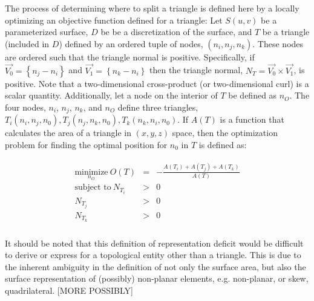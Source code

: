 The process of determining where to split a triangle is defined here by
a locally optimizing an objective function defined for a triangle: Let
$S(u,v)$ be a parameterized surface, $D$ be be a discretization of the
surface, and $T$ be a triangle (included in $D$) defined by an ordered
tuple of nodes, $\left(n_i, n_j, n_k\right)$. These nodes are ordered
such that the triangle normal is positive. Specifically, if $\vec{V_0} =
\left\{n_j - n_i \right\}$ and $\vec{V_1} = \left\{n_k - n_i\right\}$
then the triangle normal, $N_T = \vec{V_0} \times \vec{V_1}$, is
positive. Note that a two-dimensional cross-product (or two-dimensional
curl) is a scalar quantity. Additionally, let a node on the interior of
$T$ be defined as $n_O$. The four nodes, $n_i$, $n_j$, $n_k$, and $n_O$
define three triangles, $T_i\left(n_i,n_j,n_0\right), T_j\left(n_j, n_k,
n_0\right), T_k\left(n_k, n_i, n_0\right)$. If $A(T)$ is a function
that calculates the area of a triangle in $\left(x,y,z\right)$ space,
then the optimization problem for finding the optimal position for $n_0$
in $T$ is defined as:

\begin{eqnarray*}
\begin{array}{rcl}
\underset{n_O}{\text{minimize}} \ O(T) & = & - \frac{A\left(T_i\right) + A\left(T_j\right) + A\left(T_k\right) }{ A\left(T\right) }\\
\text{subject to} \ N_{T_i} & > & 0 \\
N_{T_j} & > & 0 \\ 
N_{T_k} & > & 0 \\
\end{array}
\end{eqnarray*}

It should be noted that this definition of representation deficit would
be difficult to derive or express for a topological entity other than a
triangle. This is due to the inherent ambiguity in the definition of not
only the surface area, but also the surface representation of (possibly)
non-planar elements, e.g. non-planar, or skew, quadrilateral. [MORE
POSSIBLY]
